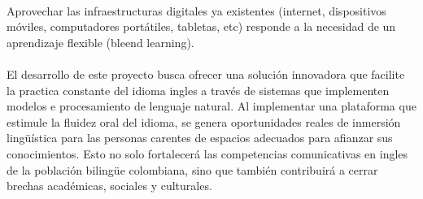 \\
Aprovechar las infraestructuras digitales ya existentes (internet, dispositivos móviles, computadores portátiles, tabletas, etc) responde a la necesidad de un aprendizaje flexible (bleend learning).
\\
\\
El desarrollo de este proyecto busca ofrecer una solución innovadora que facilite la practica constante del idioma ingles a través de sistemas que implementen modelos e procesamiento de lenguaje natural. Al implementar una plataforma que estimule la fluidez oral del idioma, se genera oportunidades reales de inmersión lingüística para las personas carentes de espacios adecuados para afianzar sus conocimientos. Esto no solo fortalecerá las competencias comunicativas en ingles de la población bilingüe colombiana, sino que también contribuirá a cerrar brechas académicas, sociales y culturales.
